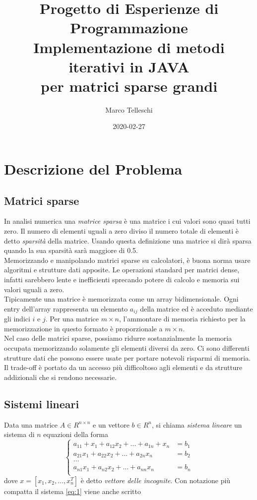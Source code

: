 \documentclass[12pt]{article}
\title{Progetto di Esperienze di Programmazione\\
    \large Implementazione di metodi iterativi in JAVA\\per matrici sparse grandi}
\author{Marco Telleschi}
\date{2020-02-27}
\begin{document}
\maketitle
{}
\newpage
{}

\tableofcontents
\newpage


\section{Descrizione del Problema}
\subsection{Matrici sparse}
In analisi numerica una \textit{matrice sparsa} è una matrice i cui valori sono quasi tutti zero. Il numero di elementi uguali a zero diviso il numero totale di elementi è detto \textit{sparsità} della matrice. Usando questa definizione una matrice si dirà sparsa quando la sua sparsità sarà maggiore di 0.5. \\
Memorizzando e manipolando matrici sparse su calcolatori, è buona norma usare algoritmi e strutture dati apposite. Le operazioni standard per matrici dense, infatti sarebbero lente e inefficienti sprecando potere di calcolo e memoria sui valori uguali a zero.\\
Tipicamente una matrice è memorizzata come un array bidimensionale. Ogni entry dell'array rappresenta un elemento \(a_{ij}\) della matrice ed è acceduto mediante gli indici \(i\) e \(j\). Per una matrice \(m \times n\), l'ammontare di memoria richiesto per la memorizzazione in questo formato è proporzionale a \(m \times n\).\\
Nel caso delle matrici sparse, possiamo ridurre sostanzialmente la memoria occupata memorizzando solamente gli elementi diversi da zero. Ci sono differenti strutture dati che possono essere usate per portare notevoli risparmi di memoria. Il trade-off è portato da un accesso più difficoltoso agli elementi e da strutture addizionali che si rendono necessarie.

\subsection{Sistemi lineari}
Data una matrice \(A \in R^{n \times n}\) e un vettore \(b \in R^n\), si chiama \textit{sistema lineare} un sistema di \(n\) equazioni della forma
\begin{equation}
\label{eq:1}
\begin{cases}
    a_{1 1}+x_1 + a_{1 2}x_2 + ... + a_{1 n}+x_n &= b_1 \\
    a_{2 1}x_1 + a_{2 2}x_2 + ... + a_{2 n}x_n &= b_2 \\
    ... \\
    a_{n 1}x_1 + a_{n 2}x_2 + ... + a_{n n}x_n &= b_n \\
\end{cases}
\end{equation}
dove \(x = [x_1,x_2,...,x_n^T]\) è detto \textit{vettore delle incognite}. Con notazione più compatta il sistema \eqref{eq:1} viene anche scritto
\end{document}
